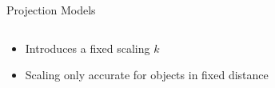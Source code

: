 \begin{frame}[t]{Projection Models}
\begin{columns}[c, onlytextwidth]
\begin{column}{0.5\textwidth}
		\end{column}
	\end{columns}
	\vspace{-1cm}
	\begin{columns}[c, onlytextwidth]
		\begin{column}{0.5\textwidth}
		\end{column}\begin{column}{0.5\textwidth}
		\begin{center}
			\scriptsize	
			\color{faublue}{
			Scaling by $k$
		}
		\end{center}
		\end{column}
	\end{columns}

	\begin{itemize}
		\item Introduces a fixed scaling $k$
		\item Scaling only accurate for objects in fixed distance
	\end{itemize}
\end{frame}


